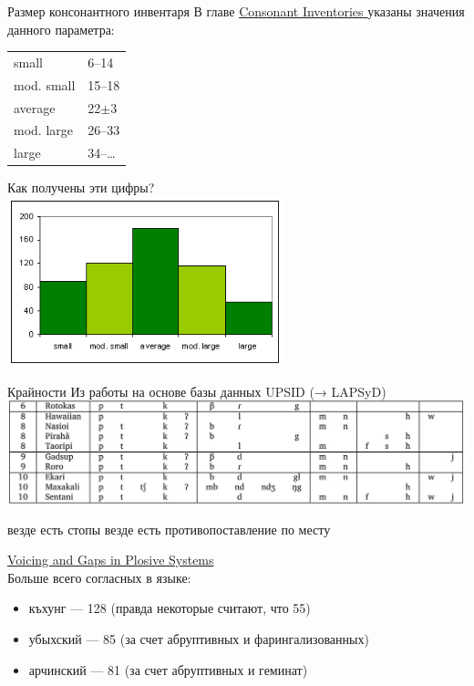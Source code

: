 \begin{frame}{Размер консонантного инвентаря}
В главе  \href{http://wals.info/feature/1A}{Consonant Inventories \citep{maddieson13cons}} указаны значения данного параметра:\\
\begin{tabular}{ll}
small & 6–14 \\
mod. small & 15–18 \\
average & 22$\pm$3 \\
mod. large & 26–33 \\
large & 34–\ldots \\
\end{tabular}
 \hfill Как получены эти цифры?\\  \pause
\includegraphics[width=8cm]{conshist.png}
\end{frame}

\begin{frame}{Крайности}
Из работы \citep{hyman08} на основе базы данных UPSID (→ LAPSyD)\\
\includegraphics[width=\textwidth]{minimalcons.jpg}\\ 
\begin{itemize}
\mytem везде есть стопы
\mytem везде есть противопоставление по месту
\end{itemize}
\href{http://wals.info/feature/5A}{Voicing and Gaps in Plosive Systems}\\
Больше всего согласных в языке:
\begin{itemize}
\item къхунг — 128 (правда некоторые считают, что 55)
\item убыхский — 85 (за счет абруптивных и фарингализованных)
\item арчинский — 81 (за счет абруптивных и геминат)
\end{itemize}
\end{frame}

